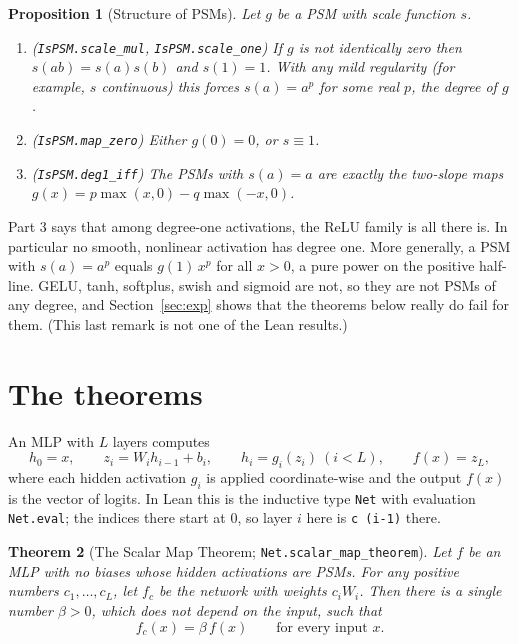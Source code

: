 \documentclass[11pt]{article}
\newtheorem{theorem}{Theorem}
\newtheorem{proposition}[theorem]{Proposition}
\theoremstyle{definition}
\theoremstyle{remark}
\newcommand{\lean}[1]{\texttt{\color{black!70}#1}}
\begin{document}
\begin{proposition}[Structure of PSMs]\label{prop:structure}
Let $g$ be a PSM with scale function $s$.
\begin{enumerate}
  \item (\lean{IsPSM.scale\_mul}, \lean{IsPSM.scale\_one}) If $g$ is not identically zero then
        $s(ab)=s(a)s(b)$ and $s(1)=1$. With any mild regularity (for example, $s$ continuous) this
        forces $s(a)=a^p$ for some real $p$, the \emph{degree} of $g$.
  \item (\lean{IsPSM.map\_zero}) Either $g(0)=0$, or $s\equiv 1$.
  \item (\lean{IsPSM.deg1\_iff}) The PSMs with $s(a)=a$ are exactly the two-slope maps
        $g(x)=p\max(x,0)-q\max(-x,0)$.
\end{enumerate}
\end{proposition}

Part 3 says that among degree-one activations, the ReLU family is all there is. In particular no
smooth, nonlinear activation has degree one. More generally, a PSM with $s(a)=a^p$ equals
$g(1)\,x^p$ for all $x>0$, a pure power on the positive half-line. GELU, tanh, softplus, swish and
sigmoid are not, so they are not PSMs of any degree, and Section~\ref{sec:exp} shows that the
theorems below really do fail for them. (This last remark is not one of the Lean results.)

\section{The theorems}\label{sec:thm}

An MLP with $L$ layers computes
\[
  h_0=x,\qquad z_i = W_i h_{i-1} + b_i,\qquad h_i = g_i(z_i)\ (i<L),\qquad f(x)=z_L,
\]
where each hidden activation $g_i$ is applied coordinate-wise and the output $f(x)$ is the vector
of logits. In Lean this is the inductive type \lean{Net} with evaluation \lean{Net.eval}; the
indices there start at $0$, so layer $i$ here is \lean{c (i-1)} there.

\begin{theorem}[The Scalar Map Theorem; \lean{Net.scalar\_map\_theorem}]\label{thm:main}
Let $f$ be an MLP with no biases whose hidden activations are PSMs. For any positive numbers
$c_1,\dots,c_L$, let $f_c$ be the network with weights $c_i W_i$. Then there is a single number
$\beta>0$, which does not depend on the input, such that
\[
  f_c(x) = \beta\, f(x)\qquad\text{for every input } x .
\]
\end{theorem}
\end{document}
